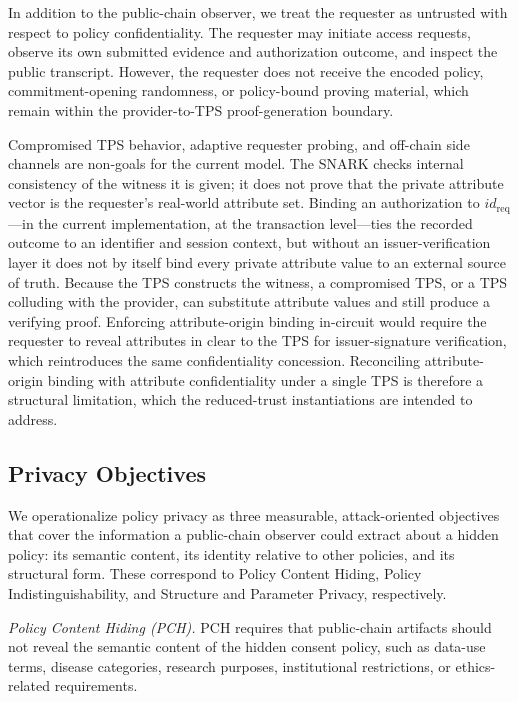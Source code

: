 In addition to the public-chain observer, we treat the requester as untrusted
with respect to policy confidentiality.
The requester may initiate access requests, observe its own submitted evidence and authorization outcome, and inspect the public transcript.
However, the requester does not receive the encoded policy, commitment-opening randomness, or policy-bound proving material, which remain within the provider-to-TPS proof-generation boundary.

Compromised TPS behavior, adaptive requester probing, and off-chain side channels
are non-goals for the current model.
The SNARK checks internal consistency of the witness it is given; it does not prove that the private attribute vector is the requester's real-world attribute set.
Binding an authorization to $\mathit{id}_{\mathrm{req}}$---in the current implementation, at the transaction level---ties the recorded outcome to an identifier and session context, but without an issuer-verification layer it does not by itself bind every private attribute value to an external source of truth.
Because the TPS constructs the witness, a compromised TPS, or a TPS colluding with the
provider, can substitute attribute values and still produce a verifying proof.
Enforcing attribute-origin binding in-circuit would require the requester to reveal
attributes in clear to the TPS for issuer-signature verification, which reintroduces the
same confidentiality concession.
Reconciling attribute-origin binding with attribute confidentiality under a single TPS is therefore a structural limitation, which the reduced-trust instantiations are intended to address.

\subsection{Privacy Objectives}

We operationalize policy privacy as three measurable, attack-oriented objectives that cover the information a public-chain observer could extract about a hidden policy: its semantic content, its identity relative to other policies, and its structural form.
These correspond to Policy Content Hiding, Policy Indistinguishability, and Structure and Parameter Privacy, respectively.

\textit{Policy Content Hiding (PCH).}
PCH requires that public-chain artifacts should not reveal the semantic content of the hidden consent policy, such as data-use terms, disease categories, research purposes, institutional restrictions, or ethics-related requirements.

